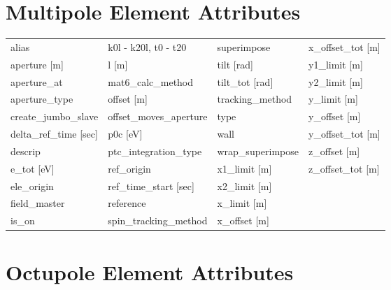  \section{Multipole Element Attributes}
 \label{s:list.multipole}
 
 \begin{tabular}{llll} \toprule
alias                            & k0l - k20l, t0 - t20             & superimpose                      & x_offset_tot [m]                 \\
aperture [m]                     & l [m]                            & tilt [rad]                       & y1_limit [m]                     \\
aperture_at                      & mat6_calc_method                 & tilt_tot [rad]                   & y2_limit [m]                     \\
aperture_type                    & offset [m]                       & tracking_method                  & y_limit [m]                      \\
create_jumbo_slave               & offset_moves_aperture            & type                             & y_offset [m]                     \\
delta_ref_time [sec]             & p0c [eV]                         & wall                             & y_offset_tot [m]                 \\
descrip                          & ptc_integration_type             & wrap_superimpose                 & z_offset [m]                     \\
e_tot [eV]                       & ref_origin                       & x1_limit [m]                     & z_offset_tot [m]                 \\
ele_origin                       & ref_time_start [sec]             & x2_limit [m]                     &                                  \\
field_master                     & reference                        & x_limit [m]                      &                                  \\
is_on                            & spin_tracking_method             & x_offset [m]                     &                                  \\
 \bottomrule
 \end{tabular}
 \vfill
 
 \section{Octupole Element Attributes}
 \label{s:list.octupole}
 
